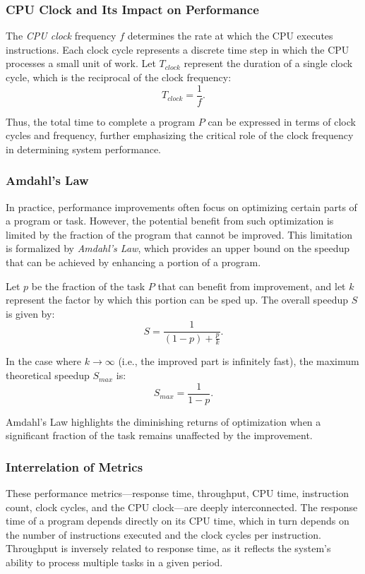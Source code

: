 \subsubsection{CPU Clock and Its Impact on Performance}

The \emph{CPU clock} frequency $f$ determines the rate at which the CPU executes instructions. Each clock cycle represents a discrete time step in which the CPU processes a small unit of work. Let $T_{clock}$ represent the duration of a single clock cycle, which is the reciprocal of the clock frequency:
\[
T_{clock} = \frac{1}{f}.
\]

Thus, the total time to complete a program $P$ can be expressed in terms of clock cycles and frequency, further emphasizing the critical role of the clock frequency in determining system performance.

\subsubsection{Amdahl's Law}

In practice, performance improvements often focus on optimizing certain parts of a program or task. However, the potential benefit from such optimization is limited by the fraction of the program that cannot be improved. This limitation is formalized by \emph{Amdahl's Law}, which provides an upper bound on the speedup that can be achieved by enhancing a portion of a program.

Let $p$ be the fraction of the task $P$ that can benefit from improvement, and let $k$ represent the factor by which this portion can be sped up. The overall speedup $S$ is given by:
\[
S = \frac{1}{(1 - p) + \frac{p}{k}}.
\]

In the case where $k \to \infty$ (i.e., the improved part is infinitely fast), the maximum theoretical speedup $S_{max}$ is:
\[
S_{max} = \frac{1}{1 - p}.
\]

Amdahl's Law highlights the diminishing returns of optimization when a significant fraction of the task remains unaffected by the improvement.

\subsubsection{Interrelation of Metrics}

These performance metrics—response time, throughput, CPU time, instruction count, clock cycles, and the CPU clock—are deeply interconnected. The response time of a program depends directly on its CPU time, which in turn depends on the number of instructions executed and the clock cycles per instruction. Throughput is inversely related to response time, as it reflects the system's ability to process multiple tasks in a given period.

